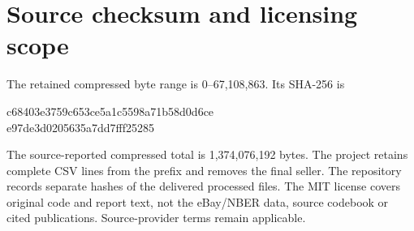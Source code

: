 \documentclass[11pt,a4paper]{article}
\begin{document}
\section{Source checksum and licensing scope}
The retained compressed byte range is 0--67,108,863. Its SHA-256 is
\begin{center}\small\ttfamily
c68403e3759c653ce5a1c5598a71b58d0d6ce\\
e97de3d0205635a7dd7fff25285
\end{center}
The source-reported compressed total is 1,374,076,192 bytes. The project
retains complete CSV lines from the prefix and removes the final seller.
The repository records separate hashes of the delivered processed files.
The MIT license covers original code and report text, not the eBay/NBER data,
source codebook or cited publications. Source-provider terms remain applicable.
\end{document}
